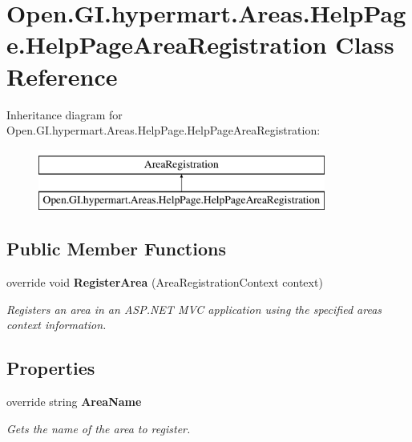 \section{Open.\+G\+I.\+hypermart.\+Areas.\+Help\+Page.\+Help\+Page\+Area\+Registration Class Reference}
\label{class_open_1_1_g_i_1_1hypermart_1_1_areas_1_1_help_page_1_1_help_page_area_registration}


 


Inheritance diagram for Open.\+G\+I.\+hypermart.\+Areas.\+Help\+Page.\+Help\+Page\+Area\+Registration\+:\begin{figure}[H]
\begin{center}
\leavevmode
\includegraphics[height=2.000000cm]{class_open_1_1_g_i_1_1hypermart_1_1_areas_1_1_help_page_1_1_help_page_area_registration}
\end{center}
\end{figure}
\subsection*{Public Member Functions}
\begin{DoxyCompactItemize}
\item 
override void \textbf{ Register\+Area} (Area\+Registration\+Context context)
\begin{DoxyCompactList}\small\item\em Registers an area in an A\+S\+P.\+N\+ET M\+VC application using the specified area\textquotesingle{}s context information. \end{DoxyCompactList}\end{DoxyCompactItemize}
\subsection*{Properties}
\begin{DoxyCompactItemize}
\item 
override string \textbf{ Area\+Name}\hspace{0.3cm}{\ttfamily  [get]}
\begin{DoxyCompactList}\small\item\em Gets the name of the area to register. \end{DoxyCompactList}\end{DoxyCompactItemize}


